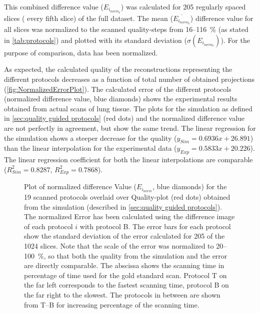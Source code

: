 This combined difference value ($E_{i_{norm_{k}}}$) was calculated for 205 regularly spaced slices (%
every fifth slice) of the full dataset. The mean ($\overline{E_{i_{norm_{k}}}}$) difference value for all slices was normalized to the scanned quality-steps from 16--\SI{116}{\percent} (as stated in \autoref{tab:protocols}) and plotted with its standard deviation ($\sigma(E_{i_{norm_{k}}})$). For the purpose of comparison, data has been normalized.

As expected, the calculated quality of the reconstructions representing the different protocols decreases as a function of total number of obtained projections (\autoref{fig:NormalizedErrorPlot}). The calculated error of the different protocols (normalized difference value, blue diamonds) shows the experimental results obtained from actual scans of lung tissue. The plots for the simulation as defined in \autoref{sec:quality guided protocols} (red dots) and the normalized difference value are not perfectly in agreement, but show the same trend. The linear regression for the simulation shows a steeper decrease for the quality ($y_{Sim}=0.6936x+26.891$) than the linear interpolation for the experimental data ($y_{Exp}=0.5833x+20.226$). The linear regression coefficient for both the linear interpolations are comparable ($R^{2}_{Sim}=0.8287$, $R^{2}_{Exp}=0.7868$).

\begin{figure}
	\noindent\makebox[\textwidth]{%
	}%
	\caption[Plot of normalized difference Value for the scanned protocols overlaid over Quality-plot obtained from the simulation]{Plot of normalized difference Value ($E_{i_{norm}}$, blue diamonds) for the 19 scanned protocols overlaid over Quality-plot (red dots) obtained from the simulation (described in \autoref{sec:quality guided protocols}). The normalized Error has been calculated using the difference image of each protocol $i$ with protocol B. The error bars for each protocol show the standard deviation of the error calculated for 205 of the 1024 slices. Note that the scale of the error was normalized to 20--\SI{100}{\percent}, so that both the quality from the simulation and the error are directly comparable. The abscissa shows the scanning time in percentage of time used for the gold standard scan. Protocol T on the far left corresponds to the fastest scanning time, protocol B on the far right to the slowest. The protocols in between are shown from T--B for increasing percentage of the scanning time.}%
	\label{fig:NormalizedErrorPlot}%
\end{figure}

